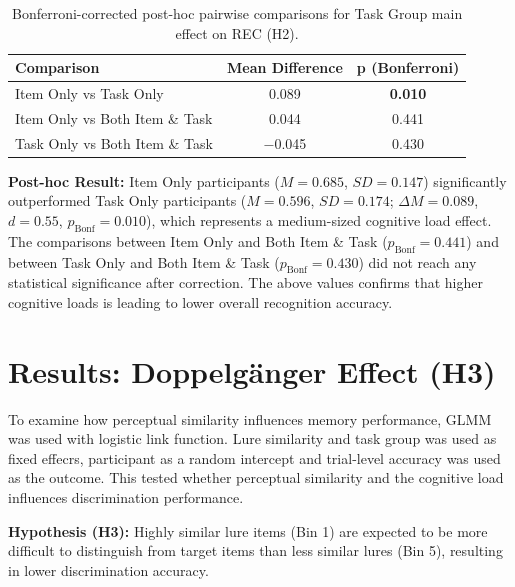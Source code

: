 \documentclass[
  12pt,
]{article}
\begin{document}
\begin{longtable}[]{@{}lcc@{}}
\caption{Bonferroni-corrected post-hoc pairwise comparisons for Task Group main effect on REC (H2).}\tabularnewline
\toprule
Comparison & Mean Difference & p (Bonferroni) \\
\midrule
Item Only vs Task Only & 0.089 & \textbf{0.010} \\
Item Only vs Both Item \& Task & 0.044 & 0.441 \\
Task Only vs Both Item \& Task & $-$0.045 & 0.430 \\
\bottomrule
\end{longtable}

\textbf{Post-hoc Result:} Item Only participants ($M = 0.685$, $SD = 0.147$) significantly outperformed Task Only participants ($M = 0.596$, $SD = 0.174$; $\Delta M = 0.089$, $d = 0.55$, $p_{\text{Bonf}} = 0.010$), which represents a medium-sized cognitive load effect. The comparisons between Item Only and Both Item \& Task ($p_{\text{Bonf}} = 0.441$) and between Task Only and Both Item \& Task ($p_{\text{Bonf}} = 0.430$) did not reach any statistical significance after correction. The above values confirms that higher cognitive loads is leading to lower overall recognition accuracy.

\section{Results: Doppelgänger Effect (H3)}

To examine how perceptual similarity influences memory performance, GLMM was used with logistic link function. Lure similarity and task group was used as fixed effecrs, participant as a random intercept and trial-level accuracy was used as the outcome. This tested whether perceptual similarity and the cognitive load influences discrimination performance.

\textbf{Hypothesis (H3):} Highly similar lure items (Bin 1) are expected to be more difficult to distinguish from target items than less similar lures (Bin 5), resulting in lower discrimination accuracy.
\end{document}
